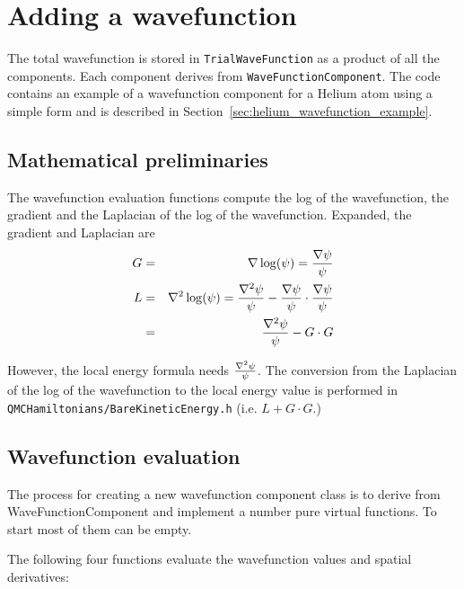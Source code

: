 \section{Adding a wavefunction}\label{sec:adding_wavefunction}

The total wavefunction is stored in \texttt{TrialWaveFunction} as a product of all
the components.  Each component derives from \texttt{WaveFunctionComponent}.
The code contains an example of a wavefunction component for a Helium atom using a simple form and
is described in Section~\ref{sec:helium_wavefunction_example}.


\subsection{Mathematical preliminaries}

The wavefunction evaluation functions compute the log of the wavefunction,
the gradient and the Laplacian of the log of the wavefunction.
Expanded, the gradient and Laplacian are
\begin{eqnarray}
G &=& \nabla \log(\psi) = \frac{\nabla \psi}{\psi} \\
L &=& \nabla^2 \log(\psi) = \frac{\nabla^2 \psi}{\psi} - \frac{\nabla \psi}{\psi} \cdot \frac{\nabla \psi}{\psi} \\
                &=& \frac{\nabla^2 \psi}{\psi} - G \cdot G
\end{eqnarray}

However, the local energy formula needs $\frac{\nabla^2 \psi}{\psi}$.  The conversion from the Laplacian of the log of the wavefunction to the local energy value is performed
in \texttt{QMCHamiltonians/BareKineticEnergy.h} (i.e. $L + G \cdot G$.)


\subsection{Wavefunction evaluation}

The process for creating a new wavefunction component class is to derive
from WaveFunctionComponent and implement a number pure virtual functions.
To start most of them can be empty.

The following four functions evaluate the wavefunction values and spatial derivatives:

